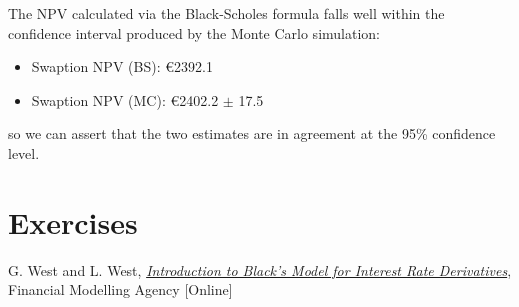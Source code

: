 The NPV calculated via the Black-Scholes formula falls well within the confidence interval produced by the Monte Carlo simulation:

\begin{itemize}
\tightlist
\item
  Swaption NPV (BS): \euro{2392.1}
\item
  Swaption NPV (MC): \euro{2402.2} $\pm$ 17.5
\end{itemize}
so we can assert that the two estimates are in agreement at the 95\% confidence level.

\section*{Exercises}


\begin{thebibliography}{9}
 G. West and L. West, \href{http://janroman.dhis.org/finance/Black/IntroToBlack.pdf}{\emph{Introduction to Black's Model for Interest Rate Derivatives}}, Financial Modelling Agency [Online]
\end{thebibliography}